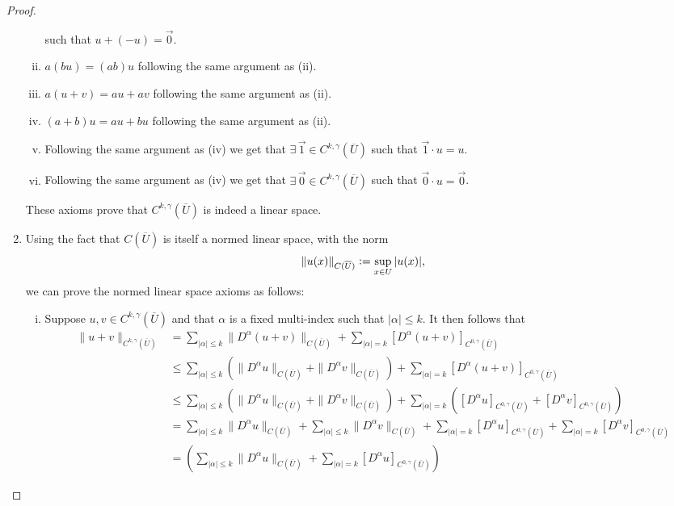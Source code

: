 \documentclass[11pt]{article}
\newcommand{\defeq}{\vcentcolon=}
\begin{document}
\begin{proof}
\begin{enumerate}[1.]
\begin{enumerate}[(i)]
					such that $u+(-u) = \vec{0}$.
				\item $a(bu) = (ab)u$ following the same argument as (ii).
				\item $a(u + v) = au + av$ following the same argument as (ii).
				\item $(a+b)u = au + bu$ following the same argument as (ii).
				\item Following the same argument as (iv) we get that $\exists \, \vec{1} \in C^{k,\gamma}(\overline{U})$
					such that $\vec{1} \cdot u = u$.
				\item Following the same argument as (iv) we get that $\exists \, \vec{0} \in C^{k,\gamma}(\overline{U})$
					such that $\vec{0} \cdot u = \vec{0}$.
			\end{enumerate}
			These axioms prove that $C^{k,\gamma}(\overline{U})$ is indeed a linear space.
		\newpage
		\item Using the fact that $C(\overline{U})$ is itself a normed linear space, with the norm
			\[\|u(x)\|_{C(\overline{U})} \defeq \sup_{x \in U}{|u(x)|},\]
			we can prove the normed linear space axioms as follows:
			\begin{enumerate}[(i)]
				\item Suppose $u,v \in C^{k,\gamma}(\overline{U})$ and that $\alpha$ is a fixed multi-index
					such that $|\alpha| \leq k$. It then follows that
					\begin{align}
						\|u+v\|_{C^{k,\gamma}(\overline{U})} &= \sum_{|\alpha| \leq k}\|D^{\alpha}(u+v)\|_{C(\overline{U})}
											+ \sum_{|\alpha| = k}[D^{\alpha}(u+v)]_{C^{0,\gamma}(\overline{U})} \\
						&\leq \sum_{|\alpha| \leq k}(\|D^{\alpha}u\|_{C(\overline{U})} + \|D^{\alpha}v\|_{C(\overline{U})})
						    + \sum_{|\alpha| = k}[D^{\alpha}(u+v)]_{C^{0,\gamma}(\overline{U})}\\
						&\leq \sum_{|\alpha| \leq k}(\|D^{\alpha}u\|_{C(\overline{U})} + \|D^{\alpha}v\|_{C(\overline{U})})
						    + \sum_{|\alpha| = k}([D^{\alpha}u]_{C^{0,\gamma}(\overline{U})} + [D^{\alpha}v]_{C^{0,\gamma}(\overline{U})})\\
						&= \sum_{|\alpha| \leq k}\|D^{\alpha}u\|_{C(\overline{U})} + \sum_{|\alpha| \leq k}\|D^{\alpha}v\|_{C(\overline{U})}
						    + \sum_{|\alpha| = k}[D^{\alpha}u]_{C^{0,\gamma}(\overline{U})} + \sum_{|\alpha| = k}[D^{\alpha}v]_{C^{0,\gamma}(\overline{U})}\\
						&= (\sum_{|\alpha| \leq k}\|D^{\alpha}u\|_{C(\overline{U})} +  \sum_{|\alpha| = k}[D^{\alpha}u]_{C^{0,\gamma}(\overline{U})})

\end{align}
\end{enumerate}
\end{enumerate}
\end{proof}
\end{document}

